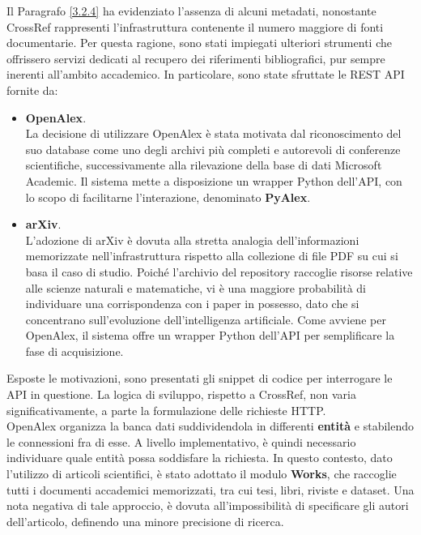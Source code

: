 Il Paragrafo \ref{3.2.4} ha evidenziato l'assenza di alcuni metadati, nonostante CrossRef rappresenti l'infrastruttura contenente il numero maggiore di fonti documentarie. Per questa ragione, sono stati impiegati ulteriori strumenti che offrissero servizi dedicati al recupero dei riferimenti bibliografici, pur sempre inerenti all'ambito accademico. In particolare, sono state sfruttate le REST API fornite da: 
\begin{itemize}
    \renewcommand{\labelitemi}{-}
    \item \textbf{OpenAlex}. \\
    La decisione di utilizzare OpenAlex è stata motivata dal riconoscimento del suo database come uno degli archivi più completi e autorevoli di conferenze scientifiche, successivamente alla rilevazione della base di dati Microsoft Academic. Il sistema mette a disposizione un wrapper Python dell'API, con lo scopo di facilitarne l'interazione, denominato \textbf{PyAlex}.
    \item \textbf{arXiv}. \\
    L'adozione di arXiv è dovuta alla stretta analogia dell'informazioni memorizzate nell'infrastruttura rispetto alla collezione di file PDF su cui si basa il caso di studio. Poiché l'archivio del repository raccoglie risorse relative alle scienze naturali e matematiche, vi è una maggiore probabilità di individuare una corrispondenza con i paper in possesso, dato che si concentrano sull'evoluzione dell'intelligenza artificiale. Come avviene per OpenAlex, il sistema offre un wrapper Python dell'API per semplificare la fase di acquisizione.
\end{itemize}
Esposte le motivazioni, sono presentati gli snippet di codice per interrogare le API in questione. La logica di sviluppo, rispetto a CrossRef, non varia significativamente, a parte la formulazione delle richieste HTTP. \vspace{7pt} \\
OpenAlex organizza la banca dati suddividendola in differenti \textbf{entità} e stabilendo le connessioni fra di esse. A livello implementativo, è quindi necessario individuare quale entità possa soddisfare la richiesta. In questo contesto, dato l'utilizzo di articoli scientifici, è stato adottato il modulo \textbf{Works}, che raccoglie tutti i documenti accademici memorizzati, tra cui tesi, libri, riviste e dataset. Una nota negativa di tale approccio, è dovuta all'impossibilità di specificare gli autori dell'articolo, definendo una minore precisione di ricerca.
